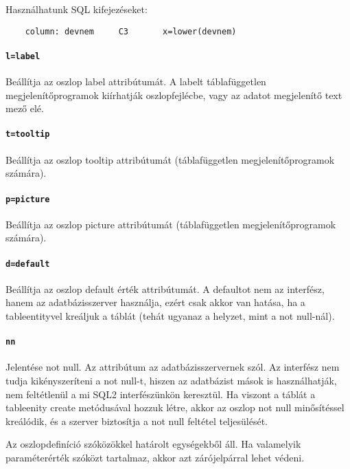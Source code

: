 Használhatunk SQL kifejezéseket:
\begin{verbatim}
    column: devnem     C3       x=lower(devnem)
\end{verbatim}

\paragraph{\tt l=label}

    Beállítja az oszlop label attribútumát.
    A labelt táblafüggetlen megjelenítőprogramok kiírhatják 
    oszlopfejlécbe, vagy az adatot megjelenítő text mező elé.

\paragraph{\tt t=tooltip}

    Beállítja az oszlop tooltip attribútumát
    (táblafüggetlen megjelenítőprogramok számára).

\paragraph{\tt p=picture}

    Beállítja az oszlop picture attribútumát
    (táblafüggetlen megjelenítőprogramok számára).

\paragraph{\tt d=default}

    Beállítja az oszlop default érték attribútumát.
    A defaultot nem az interfész, hanem az adatbázisszerver használja,
    ezért csak akkor van hatása, ha a tableentityvel kreáljuk
    a táblát (tehát ugyanaz a helyzet, mint a not null-nál).

\paragraph{\tt nn}

    Jelentése not null. Az attribútum az adatbázisszervernek szól.
    Az interfész nem tudja kikényszeríteni a not null-t, 
    hiszen az adatbázist mások is használhatják, nem feltétlenül a mi 
    SQL2 interfészünkön keresztül.
    Ha viszont a táblát a tableenity create metódusával hozzuk létre, 
    akkor az oszlop not null minősítéssel kreálódik, 
    és a szerver biztosítja a not null feltétel teljesülését.
 

Az oszlopdefiníció szóközökkel határolt egységekből áll.
Ha valamelyik paraméterérték szóközt tartalmaz, akkor
azt zárójelpárral lehet védeni. 
 
